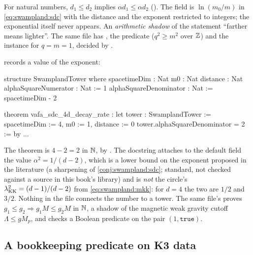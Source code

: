 \begin{leanbox}
For natural numbers, $d_1\le d_2$ implies $\alpha d_1\le\alpha d_2$ ().
The field  is $\ln(m_0/m)$ in \eqref{eq:swampland:sdc} with the distance
and the exponent restricted to integers; the exponential itself never appears. An
\emph{arithmetic shadow} of the statement ``farther means lighter''. The same file has
, the predicate  ($q^2\ge m^2$ over $\mathbb{Z}$) and the instance
 for $q=m=1$, decided by .
\end{leanbox}

 records a value of the exponent:
\begin{leancode}
structure SwamplandTower where
  spacetimeDim : Nat
  m0 : Nat
  distance : Nat
  alphaSquareNumerator : Nat := 1
  alphaSquareDenominator : Nat := spacetimeDim - 2

theorem vafa_sdc_4d_decay_rate :
    let tower : SwamplandTower := { spacetimeDim := 4, m0 := 1, distance := 0 }
    tower.alphaSquareDenominator = 2 := by ...
\end{leancode}

\begin{leanbox}
The theorem is $4-2=2$ in $\mathbb{N}$, by . The docstring attaches to the default field the
value $\alpha^2=1/(d-2)$, which is a lower bound on the exponent proposed in the literature (a
sharpening of \cref{conj:swampland:sdc}; standard, not checked against a source in this book's
library) and is \emph{not} the circle's $\lambda_{\rm KK}^2=(d-1)/(d-2)$ from
\eqref{eq:swampland:mkk}: for $d=4$ the two are $1/2$ and $3/2$. Nothing in the file connects the
number to a tower. The same file's  proves
$g_1\le g_2\Rightarrow g_1M\le g_2M$ in $\mathbb{N}$, a shadow of the magnetic weak gravity cutoff
$\Lambda\le gM_p$, and  checks a Boolean predicate on the pair
$(1,\mathtt{true})$.
\end{leanbox}

\subsection{A bookkeeping predicate on K3 data}

